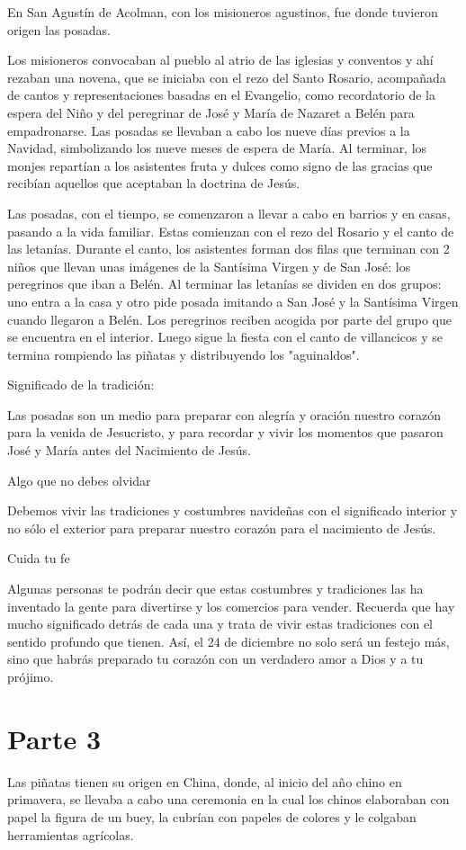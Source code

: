 En San Agustín de Acolman, con los misioneros agustinos, fue donde tuvieron origen las posadas.

Los misioneros convocaban al pueblo al atrio de las iglesias y conventos y ahí rezaban una novena, que se iniciaba con el rezo del Santo Rosario, acompañada de cantos y representaciones basadas en el Evangelio, como recordatorio de la espera del Niño y del peregrinar de José y María de Nazaret a Belén para empadronarse. Las posadas se llevaban a cabo los nueve días previos a la Navidad, simbolizando los nueve meses de espera de María. Al terminar, los monjes repartían a los asistentes fruta y dulces como signo de las gracias que recibían aquellos que aceptaban la doctrina de Jesús.

Las posadas, con el tiempo, se comenzaron a llevar a cabo en barrios y en casas, pasando a la vida familiar. Estas comienzan con el rezo del Rosario y el canto de las letanías. Durante el canto, los asistentes forman dos filas que terminan con 2 niños que llevan unas imágenes de la Santísima Virgen y de San José: los peregrinos que iban a Belén. Al terminar las letanías se dividen en dos grupos: uno entra a la casa y otro pide posada imitando a San José y la Santísima Virgen cuando llegaron a Belén. Los peregrinos reciben acogida por parte del grupo que se encuentra en el interior. Luego sigue la fiesta con el canto de villancicos y se termina rompiendo las piñatas y distribuyendo los "aguinaldos".

Significado de la tradición:

Las posadas son un medio para preparar con alegría y oración nuestro corazón para la venida de Jesucristo, y para recordar y vivir los momentos que pasaron José y María antes del Nacimiento de Jesús.

Algo que no debes olvidar

Debemos vivir las tradiciones y costumbres navideñas con el significado interior y no sólo el exterior para preparar nuestro corazón para el nacimiento de Jesús.

Cuida tu fe

Algunas personas te podrán decir que estas costumbres y tradiciones las ha inventado la gente para divertirse y los comercios para vender. Recuerda que hay mucho significado detrás de cada una y trata de vivir estas tradiciones con el sentido profundo que tienen. Así, el 24 de diciembre no solo será un festejo más, sino que habrás preparado tu corazón con un verdadero amor a Dios y a tu prójimo.

\section{Parte 3}
Las piñatas tienen su origen en China, donde, al inicio del año chino en primavera, se llevaba a cabo una ceremonia en la cual los chinos elaboraban con papel la figura de un buey, la cubrían con papeles de colores y le colgaban herramientas agrícolas.

